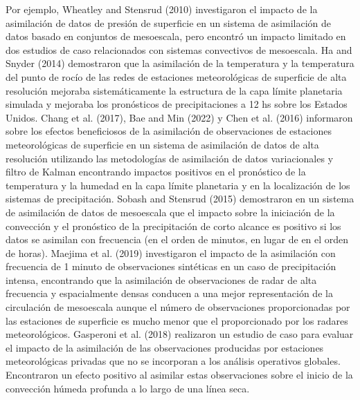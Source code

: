 \documentclass[12pt,oneside,a4paper]{reedthesis}
\begin{document}
Por ejemplo, Wheatley and Stensrud (2010) investigaron el impacto de la asimilación de datos de presión de superficie en un sistema de asimilación de datos basado en conjuntos de mesoescala, pero encontró un impacto limitado en dos estudios de caso relacionados con sistemas convectivos de mesoescala. Ha and Snyder (2014) demostraron que la asimilación de la temperatura y la temperatura del punto de rocío de las redes de estaciones meteorológicas de superficie de alta resolución mejoraba sistemáticamente la estructura de la capa límite planetaria simulada y mejoraba los pronósticos de precipitaciones a 12 hs sobre los Estados Unidos. Chang et al. (2017), Bae and Min (2022) y Chen et al. (2016) informaron sobre los efectos beneficiosos de la asimilación de observaciones de estaciones meteorológicas de superficie en un sistema de asimilación de datos de alta resolución utilizando las metodologías de asimilación de datos variacionales y filtro de Kalman encontrando impactos positivos en el pronóstico de la temperatura y la humedad en la capa límite planetaria y en la localización de los sistemas de precipitación. Sobash and Stensrud (2015) demostraron en un sistema de asimilación de datos de mesoescala que el impacto sobre la iniciación de la convección y el pronóstico de la precipitación de corto alcance es positivo si los datos se asimilan con frecuencia (en el orden de minutos, en lugar de en el orden de horas). Maejima et al. (2019) investigaron el impacto de la asimilación con frecuencia de 1 minuto de observaciones sintéticas en un caso de precipitación intensa, encontrando que la asimilación de observaciones de radar de alta frecuencia y espacialmente densas conducen a una mejor representación de la circulación de mesoescala aunque el número de observaciones proporcionadas por las estaciones de superficie es mucho menor que el proporcionado por los radares meteorológicos. Gasperoni et al. (2018) realizaron un estudio de caso para evaluar el impacto de la asimilación de las observaciones producidas por estaciones meteorológicas privadas que no se incorporan a los análisis operativos globales. Encontraron un efecto positivo al asimilar estas observaciones sobre el inicio de la convección húmeda profunda a lo largo de una línea seca.
\end{document}
